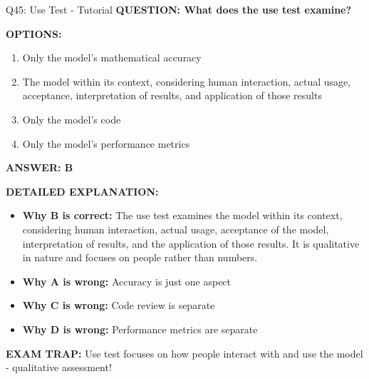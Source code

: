 \documentclass[8pt]{beamer}
\begin{document}
	\begin{frame}{Q45: Use Test - Tutorial}
		\fontsize{6.5}{7.5}\selectfont
		\textbf{QUESTION: What does the use test examine?}
		
		\vspace{0.1cm}
		\textbf{OPTIONS:}
		\begin{enumerate}
			\item Only the model's mathematical accuracy
			\item The model within its context, considering human interaction, actual usage, acceptance, interpretation of results, and application of those results
			\item Only the model's code
			\item Only the model's performance metrics
		\end{enumerate}
		
		\vspace{0.1cm}
		\textcolor{myblue}{\textbf{ANSWER: B}}
		
		\vspace{0.1cm}
		\textbf{DETAILED EXPLANATION:}
		\begin{itemize}
			\item \textbf{Why B is correct:} The use test examines the model within its context, considering human interaction, actual usage, acceptance of the model, interpretation of results, and the application of those results. It is qualitative in nature and focuses on people rather than numbers.
			\item \textbf{Why A is wrong:} Accuracy is just one aspect
			\item \textbf{Why C is wrong:} Code review is separate
			\item \textbf{Why D is wrong:} Performance metrics are separate
		\end{itemize}
		
		\textcolor{myred}{\textbf{EXAM TRAP:}} Use test focuses on \textcolor{myblue}{how people interact with and use the model} - qualitative assessment!
	\end{frame}
	
\end{document}
